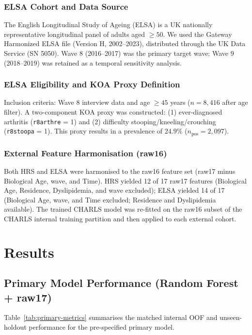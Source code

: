 \documentclass[11pt,a4paper]{article}
\begin{document}
\subsubsection*{ELSA Cohort and Data Source}
The English Longitudinal Study of Ageing (ELSA) is a UK nationally representative longitudinal
panel of adults aged $\geq 50$. We used the Gateway Harmonized ELSA file (Version H, 2002--2023),
distributed through the UK Data Service (SN 5050). Wave 8 (2016--2017) was the primary target wave;
Wave 9 (2018--2019) was retained as a temporal sensitivity analysis.

\subsubsection*{ELSA Eligibility and KOA Proxy Definition}
Inclusion criteria: Wave 8 interview data and age $\geq 45$ years ($n=8{,}416$ after age filter).
A two-component KOA proxy was constructed:
(1) ever-diagnosed arthritis (\texttt{r8arthre} = 1) and
(2) difficulty stooping/kneeling/crouching (\texttt{r8stoopa} = 1).
This proxy results in a prevalence of $24.9\%$ ($n_{\text{pos}}=2{,}097$).

\subsubsection*{External Feature Harmonisation (raw16)}
Both HRS and ELSA were harmonised to the raw16 feature set (raw17 minus Biological Age, wave, and
Time). HRS yielded 12 of 17 raw17 features (Biological Age, Residence, Dyslipidemia, and wave
excluded); ELSA yielded 14 of 17 (Biological Age, wave, and Time excluded; Residence and
Dyslipidemia available). The trained CHARLS model was re-fitted on the raw16 subset of the CHARLS
internal training partition and then applied to each external cohort.

\section{Results}

\subsection{Primary Model Performance (Random Forest + raw17)}
Table~\ref{tab:primary-metrics} summarises the matched internal OOF and unseen-holdout performance
for the pre-specified primary model.
\end{document}
